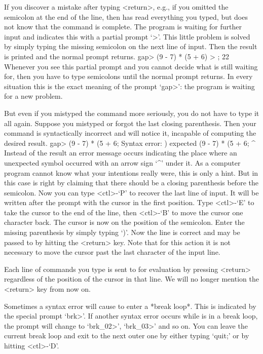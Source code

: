 If you discover a mistake after typing <return>, e.g., if you omitted the
semicolon  at the end of the  line, then {\GAP}  has  read everything you
typed, but does  not know that the command   is complete. The  program is
waiting for further input and  indicates this with  a partial prompt `>'.
This little  problem is solved by simply  typing the missing semicolon on
the next line of input. Then the result is  printed and the normal prompt
returns.
\beginexample
    gap> (9 - 7) * (5 + 6)
    > ;
    22 
\endexample
Whenever you see this partial prompt and you cannot decide what {\GAP} is
still  waiting for, then  you have  to type  semicolons  until the normal
prompt  returns.  In  every situation this  is the  exact meaning of  the
prompt `gap>': the program is waiting for a new problem.

But even if you  mistyped the command more  seriously, you do not have to
type   it all again. Suppose   you  mistyped or  forgot  the last closing
parenthesis. Then your command is syntactically incorrect and {\GAP} will
notice it, incapable of computing the desired result.
\beginexample
    gap> (9 - 7) * (5 + 6;
    Syntax error: ) expected
    (9 - 7) * (5 + 6;
                    ^
\endexample
{}%
Instead of the result an error message  occurs indicating the place where
an unexpected  symbol occurred with   an arrow sign  `^'  under it.  As a
computer program  cannot know what your  intentions really were,  this is
only  a hint. But in this  case {\GAP}  is  right by  claiming that there
should be a closing  parenthesis before the  semicolon. Now you  can type
<ctl>-`P' to recover the last line of input. It will be written after the
prompt with the cursor in the first  position. Type <ctl>-`E' to take the
cursor  to the end of   the line, then <ctl>-`B'   to move the cursor one
character back. The cursor is now on the position of the semicolon. Enter
the missing parenthesis by simply typing `)'. Now the line is correct and
may be passed to {\GAP}  by hitting the <return>  key. Note that for this
action it is not necessary to move the cursor  past the last character of
the input line.

Each line  of commands  you  type is sent to    {\GAP} for evaluation  by
pressing <return> regardless of the position of  the cursor in that line.
We will no longer mention the <return> key from now on.

%
Sometimes a syntax error will cause {\GAP} to enter a *break loop*.  This
is indicated by the special prompt `brk>'. If another syntax error occurs
while  {\GAP} is in  a break loop, the prompt  will  change to `brk_02>',
`brk_03>' and so on. You can leave the current break loop and exit to the
next outer one by either typing `quit;' or by hitting <ctl>-`D'.

